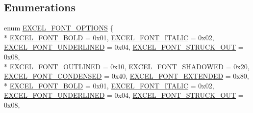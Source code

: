 \subsection*{Enumerations}
\begin{DoxyCompactItemize}
\item 
enum \hyperlink{namespace_excel_format_a667f2d7917ef20f836e5cfec93751d05}{E\+X\+C\+E\+L\+\_\+\+F\+O\+N\+T\+\_\+\+O\+P\+T\+I\+O\+N\+S} \{ \\*
\hyperlink{namespace_excel_format_a667f2d7917ef20f836e5cfec93751d05a1f34ef0f31a6ebb73a06f6d695cd2e8b}{E\+X\+C\+E\+L\+\_\+\+F\+O\+N\+T\+\_\+\+B\+O\+L\+D} = 0x01, 
\hyperlink{namespace_excel_format_a667f2d7917ef20f836e5cfec93751d05a208e5889a82ee1425d5fe66e8bb5f461}{E\+X\+C\+E\+L\+\_\+\+F\+O\+N\+T\+\_\+\+I\+T\+A\+L\+I\+C} = 0x02, 
\hyperlink{namespace_excel_format_a667f2d7917ef20f836e5cfec93751d05a52b83a79ad5a54b662cf30637d7180e9}{E\+X\+C\+E\+L\+\_\+\+F\+O\+N\+T\+\_\+\+U\+N\+D\+E\+R\+L\+I\+N\+E\+D} = 0x04, 
\hyperlink{namespace_excel_format_a667f2d7917ef20f836e5cfec93751d05abd9a8e7fe4e36df1fbd74221f52dbc77}{E\+X\+C\+E\+L\+\_\+\+F\+O\+N\+T\+\_\+\+S\+T\+R\+U\+C\+K\+\_\+\+O\+U\+T} = 0x08, 
\\*
\hyperlink{namespace_excel_format_a667f2d7917ef20f836e5cfec93751d05a2593d75f9c88ca21078192e3bb449d5e}{E\+X\+C\+E\+L\+\_\+\+F\+O\+N\+T\+\_\+\+O\+U\+T\+L\+I\+N\+E\+D} = 0x10, 
\hyperlink{namespace_excel_format_a667f2d7917ef20f836e5cfec93751d05a04f9f154a8b707dc0549db13a4078ec4}{E\+X\+C\+E\+L\+\_\+\+F\+O\+N\+T\+\_\+\+S\+H\+A\+D\+O\+W\+E\+D} = 0x20, 
\hyperlink{namespace_excel_format_a667f2d7917ef20f836e5cfec93751d05a9b5828572d3fdc91a6a4a91789c32602}{E\+X\+C\+E\+L\+\_\+\+F\+O\+N\+T\+\_\+\+C\+O\+N\+D\+E\+N\+S\+E\+D} = 0x40, 
\hyperlink{namespace_excel_format_a667f2d7917ef20f836e5cfec93751d05ac53f1f7b8da98ff92d4a8e91602f4d47}{E\+X\+C\+E\+L\+\_\+\+F\+O\+N\+T\+\_\+\+E\+X\+T\+E\+N\+D\+E\+D} = 0x80, 
\\*
\hyperlink{namespace_excel_format_a667f2d7917ef20f836e5cfec93751d05a1f34ef0f31a6ebb73a06f6d695cd2e8b}{E\+X\+C\+E\+L\+\_\+\+F\+O\+N\+T\+\_\+\+B\+O\+L\+D} = 0x01, 
\hyperlink{namespace_excel_format_a667f2d7917ef20f836e5cfec93751d05a208e5889a82ee1425d5fe66e8bb5f461}{E\+X\+C\+E\+L\+\_\+\+F\+O\+N\+T\+\_\+\+I\+T\+A\+L\+I\+C} = 0x02, 
\hyperlink{namespace_excel_format_a667f2d7917ef20f836e5cfec93751d05a52b83a79ad5a54b662cf30637d7180e9}{E\+X\+C\+E\+L\+\_\+\+F\+O\+N\+T\+\_\+\+U\+N\+D\+E\+R\+L\+I\+N\+E\+D} = 0x04, 
\hyperlink{namespace_excel_format_a667f2d7917ef20f836e5cfec93751d05abd9a8e7fe4e36df1fbd74221f52dbc77}{E\+X\+C\+E\+L\+\_\+\+F\+O\+N\+T\+\_\+\+S\+T\+R\+U\+C\+K\+\_\+\+O\+U\+T} = 0x08, 

\end{DoxyCompactItemize}
